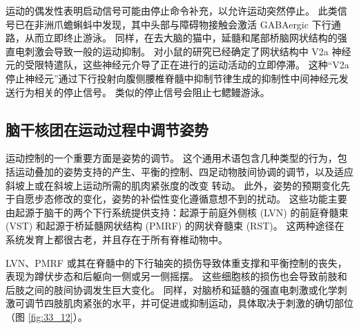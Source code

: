运动的偶发性表明启动信号可能由停止命令补充，以允许运动突然停止。
此类信号已在非洲爪蟾蝌蚪中发现，其中头部与障碍物接触会激活 GABAergic 下行通路，从而立即终止游泳。
同样，在去大脑的猫中，延髓和尾部桥脑网状结构的强直电刺激会导致一般的运动抑制。
对小鼠的研究已经确定了网状结构中 V2a 神经元的受限特遣队，这些神经元介导了正在进行的运动活动的立即停滞。
这种“V2a 停止神经元”通过下行投射向腹侧腰椎脊髓中抑制节律生成的抑制性中间神经元发送行为相关的停止信号。
类似的停止信号会阻止七鳃鳗游泳。


\subsection{脑干核团在运动过程中调节姿势}

运动控制的一个重要方面是姿势的调节。
这个通用术语包含几种类型的行为，包括运动叠加的姿势支持的产生、平衡的控制、四足动物肢间协调的调节，以及适应斜坡上或在斜坡上运动所需的肌肉紧张度的改变 转动。
此外，姿势的预期变化先于自愿步态修改的变化，姿势的补偿性变化遵循意想不到的扰动。
这些功能主要由起源于脑干的两个下行系统提供支持：起源于前庭外侧核 (LVN) 的前庭脊髓束 (VST) 和起源于桥延髓网状结构 (PMRF) 的网状脊髓束 (RST)。
这两种途径在系统发育上都很古老，并且存在于所有脊椎动物中。


LVN、PMRF 或其在脊髓中的下行轴突的损伤导致体重支撑和平衡控制的丧失，表现为蹲伏步态和后躯向一侧或另一侧摇摆。
这些细胞核的损伤也会导致前肢和后肢之间的肢间协调发生巨大变化。
同样，对脑桥和延髓的强直电刺激或化学刺激可调节四肢肌肉紧张的水平，并可促进或抑制运动，具体取决于刺激的确切部位（图 \ref{fig:33_12}）。



